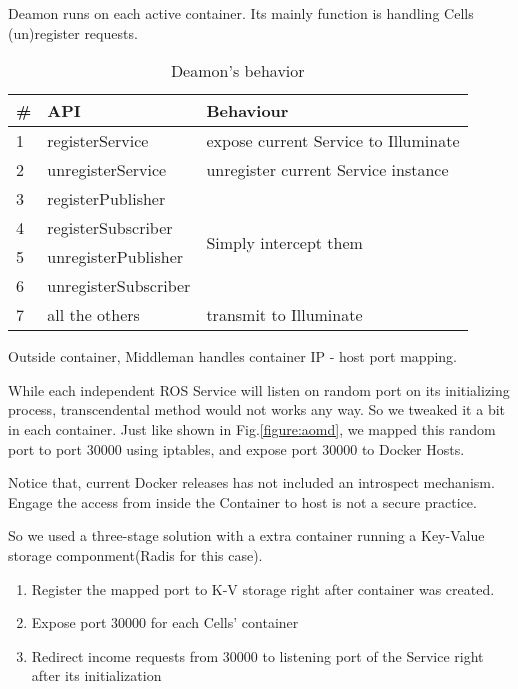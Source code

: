 Deamon runs on each active container.
Its mainly function is handling Cells (un)register requests.
\begin{table}[H]
  \renewcommand{\arraystretch}{1.3}
  \caption{Deamon's behavior}
  \label{table:demans-behavior}
  \centering
  \begin{tabular}{|l|l|l|}
     \hline
     \bfseries \# & \bfseries API & \bfseries Behaviour \\
     \hline
     1 & registerService & expose current Service to Illuminate\\
     \hline
     2 & unregisterService & unregister current Service instance \\
     \hline
     3 & registerPublisher & \multirow{4}{*}{Simply intercept them} \\
     \cline{1-2}
     4 & registerSubscriber    &  \\
     \cline{1-2}
     5 & unregisterPublisher   &  \\
     \cline{1-2}
     6 & unregisterSubscriber  &  \\
     \hline
     7 & all the others & transmit to Illuminate \\
     \hline
  \end{tabular}
\end{table}

Outside container, Middleman handles container IP - host port mapping.

While each independent ROS Service will listen on random port on its
initializing process, transcendental method would not works any way. 
So we tweaked it a bit in each container.
Just like shown in Fig.\ref{figure:aomd}, we mapped this random port to
port 30000 using iptables, and expose port 30000 to Docker Hosts.

Notice that, current Docker releases has not included an introspect mechanism.
Engage the access from inside the Container to host is not a secure practice.

So we used a three-stage solution with a extra container running a Key-Value storage componment(Radis for this case).
\begin{enumerate}
    \item Register the mapped port to K-V storage right after container was created.
    \item Expose port 30000 for each Cells' container
    \item Redirect income requests from 30000 to listening port of the Service right after its initialization
\end{enumerate}

